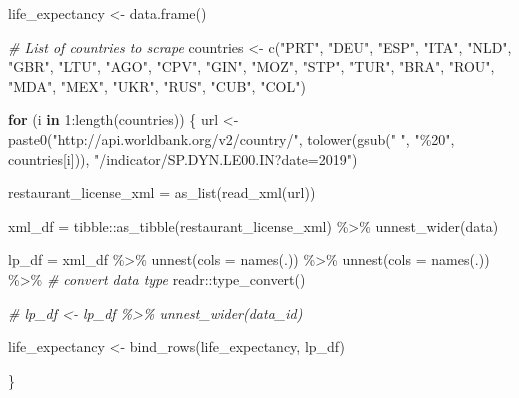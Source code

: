 \documentclass[
]{article}
\newenvironment{Shaded}{\begin{snugshade}}{\end{snugshade}}
\newcommand{\AttributeTok}[1]{\textcolor[rgb]{0.77,0.63,0.00}{#1}}
\newcommand{\CommentTok}[1]{\textcolor[rgb]{0.56,0.35,0.01}{\textit{#1}}}
\newcommand{\ControlFlowTok}[1]{\textcolor[rgb]{0.13,0.29,0.53}{\textbf{#1}}}
\newcommand{\DecValTok}[1]{\textcolor[rgb]{0.00,0.00,0.81}{#1}}
\newcommand{\FunctionTok}[1]{\textcolor[rgb]{0.00,0.00,0.00}{#1}}
\newcommand{\NormalTok}[1]{#1}
\newcommand{\OtherTok}[1]{\textcolor[rgb]{0.56,0.35,0.01}{#1}}
\newcommand{\SpecialCharTok}[1]{\textcolor[rgb]{0.00,0.00,0.00}{#1}}
\newcommand{\StringTok}[1]{\textcolor[rgb]{0.31,0.60,0.02}{#1}}
\begin{document}
\begin{Shaded}
\begin{Highlighting}[]
\NormalTok{life\_expectancy }\OtherTok{\textless{}{-}} \FunctionTok{data.frame}\NormalTok{()}

\CommentTok{\# List of countries to scrape}
\NormalTok{countries }\OtherTok{\textless{}{-}} \FunctionTok{c}\NormalTok{(}\StringTok{"PRT"}\NormalTok{, }\StringTok{"DEU"}\NormalTok{, }\StringTok{"ESP"}\NormalTok{, }\StringTok{"ITA"}\NormalTok{, }\StringTok{"NLD"}\NormalTok{, }\StringTok{"GBR"}\NormalTok{, }\StringTok{"LTU"}\NormalTok{, }\StringTok{"AGO"}\NormalTok{, }\StringTok{"CPV"}\NormalTok{, }\StringTok{"GIN"}\NormalTok{, }\StringTok{"MOZ"}\NormalTok{, }\StringTok{"STP"}\NormalTok{, }\StringTok{"TUR"}\NormalTok{, }\StringTok{"BRA"}\NormalTok{, }\StringTok{"ROU"}\NormalTok{, }\StringTok{"MDA"}\NormalTok{, }\StringTok{"MEX"}\NormalTok{, }\StringTok{"UKR"}\NormalTok{, }\StringTok{"RUS"}\NormalTok{, }\StringTok{"CUB"}\NormalTok{, }\StringTok{"COL"}\NormalTok{)}

\ControlFlowTok{for}\NormalTok{ (i }\ControlFlowTok{in} \DecValTok{1}\SpecialCharTok{:}\FunctionTok{length}\NormalTok{(countries)) \{}
\NormalTok{  url }\OtherTok{\textless{}{-}} \FunctionTok{paste0}\NormalTok{(}\StringTok{"http://api.worldbank.org/v2/country/"}\NormalTok{, }\FunctionTok{tolower}\NormalTok{(}\FunctionTok{gsub}\NormalTok{(}\StringTok{" "}\NormalTok{, }\StringTok{"\%20"}\NormalTok{, countries[i])), }\StringTok{"/indicator/SP.DYN.LE00.IN?date=2019"}\NormalTok{)}

\NormalTok{restaurant\_license\_xml }\OtherTok{=} \FunctionTok{as\_list}\NormalTok{(}\FunctionTok{read\_xml}\NormalTok{(url))}

\NormalTok{xml\_df }\OtherTok{=}\NormalTok{ tibble}\SpecialCharTok{::}\FunctionTok{as\_tibble}\NormalTok{(restaurant\_license\_xml) }\SpecialCharTok{\%\textgreater{}\%}
  \FunctionTok{unnest\_wider}\NormalTok{(data)}

\NormalTok{lp\_df }\OtherTok{=}\NormalTok{ xml\_df }\SpecialCharTok{\%\textgreater{}\%}
  \FunctionTok{unnest}\NormalTok{(}\AttributeTok{cols =} \FunctionTok{names}\NormalTok{(.)) }\SpecialCharTok{\%\textgreater{}\%}
  \FunctionTok{unnest}\NormalTok{(}\AttributeTok{cols =} \FunctionTok{names}\NormalTok{(.)) }\SpecialCharTok{\%\textgreater{}\%}
  \CommentTok{\# convert data type}
\NormalTok{  readr}\SpecialCharTok{::}\FunctionTok{type\_convert}\NormalTok{()}

\CommentTok{\# lp\_df \textless{}{-} lp\_df \%\textgreater{}\% unnest\_wider(data\_id)}

\NormalTok{life\_expectancy }\OtherTok{\textless{}{-}} \FunctionTok{bind\_rows}\NormalTok{(life\_expectancy, lp\_df)}

\NormalTok{\}}
\end{Highlighting}
\end{Shaded}
\end{document}

